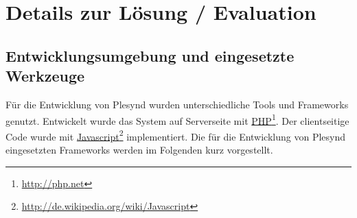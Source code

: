 \chapter{Details zur Lösung / Evaluation} 
\label{chapter:Kapitel6}

\section{Entwicklungsumgebung und eingesetzte Werkzeuge}\label{section:entwicklungsumgebungen_tools}
Für die Entwicklung von Plesynd wurden unterschiedliche Tools und Frameworks genutzt. Entwickelt wurde das System auf Serverseite mit \href{http://php.net}{PHP}\footnote{\url{http://php.net}}. Der clientseitige Code wurde mit \href{http://de.wikipedia.org/wiki/Javascript}{Javascript}\footnote{\url{http://de.wikipedia.org/wiki/Javascript}} implementiert. Die für die Entwicklung von Plesynd eingesetzten Frameworks werden im Folgenden kurz vorgestellt.

